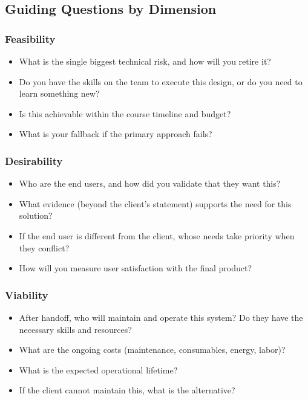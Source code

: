 \subsection{Guiding Questions by Dimension}

\subsubsection*{Feasibility}
\begin{paquestion}
\begin{itemize}[nosep,leftmargin=1.5em]
\item What is the single biggest technical risk, and how will you retire it?
\item Do you have the skills on the team to execute this design, or do you need to learn something new?
\item Is this achievable within the course timeline and budget?
\item What is your fallback if the primary approach fails?
\end{itemize}
\end{paquestion}

\subsubsection*{Desirability}
\begin{paquestion}
\begin{itemize}[nosep,leftmargin=1.5em]
\item Who are the end users, and how did you validate that they want this?
\item What evidence (beyond the client's statement) supports the need for this solution?
\item If the end user is different from the client, whose needs take priority when they conflict?
\item How will you measure user satisfaction with the final product?
\end{itemize}
\end{paquestion}

\subsubsection*{Viability}
\begin{paquestion}
\begin{itemize}[nosep,leftmargin=1.5em]
\item After handoff, who will maintain and operate this system? Do they have the necessary skills and resources?
\item What are the ongoing costs (maintenance, consumables, energy, labor)?
\item What is the expected operational lifetime?
\item If the client cannot maintain this, what is the alternative?
\end{itemize}
\end{paquestion}

